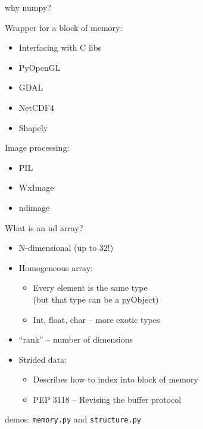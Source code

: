 \documentclass{beamer}
\begin{document}
\begin{frame}[fragile]{why numpy?}

{\Large Wrapper for a block of memory:}

\begin{itemize}
  \item Interfacing with C libs
  \item PyOpenGL
  \item GDAL
  \item NetCDF4
  \item Shapely
\end{itemize}

{\Large Image processing:}
\begin{itemize}
  \item PIL
  \item WxImage
  \item ndimage
\end{itemize}

\end{frame} 

\begin{frame}[fragile]{What is an nd array?}
\begin{itemize}
  \item N-dimensional (up to 32!)
  \item Homogeneous array:
  \begin{itemize}
    \item Every element is the same type\\
          (but that type can be a pyObject)
    \item Int, float, char -- more exotic types
  \end{itemize}
  \item ``rank'' – number of dimensions
  \item Strided data:
  \begin{itemize}
    \item Describes how to index into block of memory
    \item PEP 3118 -- Revising the buffer protocol
  \end{itemize}
\end{itemize}

\vfill
{\large demos: \verb|memory.py| and \verb|structure.py|}

\end{frame} 
\end{document}
